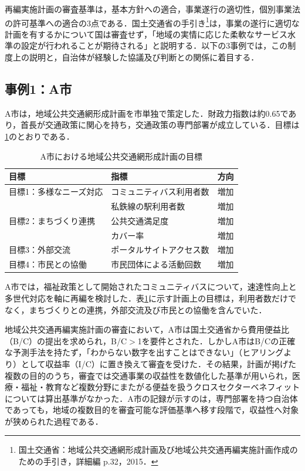 再編実施計画の審査基準は，基本方針への適合，事業遂行の適切性，個別事業法の許可基準への適合の3点である．国土交通省の手引き\footnote{国土交通省：地域公共交通網形成計画及び地域公共交通再編実施計画作成のための手引き，詳細編 p.32，2015．}は，事業の遂行に適切な計画を有するかについて国は審査せず，「地域の実情に応じた柔軟なサービス水準の設定が行われることが期待される」と説明する．以下の3事例では，この制度上の説明と，自治体が経験した協議及び判断との関係に着目する．

\subsection{事例1：A市}
\label{subsec:ch5_cityA}

A市は，地域公共交通網形成計画を市単独で策定した．財政力指数は約0.65であり，首長が交通政策に関心を持ち，交通政策の専門部署が成立している．目標は\ref{tab:city_a}のとおりである．

\begin{table}[htb]
\caption{A市における地域公共交通網形成計画の目標}
\label{tab:city_a}
\centering
\small
\begin{tabular}{|p{3cm}|p{5cm}|c|}\hline
目標 & 指標 & 方向 \\\hline
目標1：多様なニーズ対応 & コミュニティバス利用者数 & 増加 \\
 & 私鉄線の駅利用者数 & 増加 \\\hline
目標2：まちづくり連携 & 公共交通満足度 & 増加 \\
 & カバー率 & 増加 \\\hline
目標3：外部交流 & ポータルサイトアクセス数 & 増加 \\\hline
目標4：市民との協働 & 市民団体による活動回数 & 増加 \\\hline
\end{tabular}
\end{table}

A市では，福祉政策として開始されたコミュニティバスについて，速達性向上と多世代対応を軸に再編を検討した．表\ref{tab:city_a}に示す計画上の目標は，利用者数だけでなく，まちづくりとの連携，外部交流及び市民との協働を含んでいた．

地域公共交通再編実施計画の審査において，A市は国土交通省から費用便益比（B/C）の提出を求められ，B/C$>$1を要件とされた．しかしA市はB/Cの正確な予測手法を持たず，「わからない数字を出すことはできない」（ヒアリングより）として収益率（I/C）に置き換えて審査を受けた．その結果，計画が掲げた複数の目的のうち，審査では交通事業の収益性を数値化した基準が用いられ，医療・福祉・教育など複数分野にまたがる便益を扱うクロスセクターベネフィット\cite{nishimura2014}については算出基準がなかった．A市の記録が示すのは，専門部署を持つ自治体であっても，地域の複数目的を審査可能な評価基準へ移す段階で，収益性へ対象が狭められた過程である．

